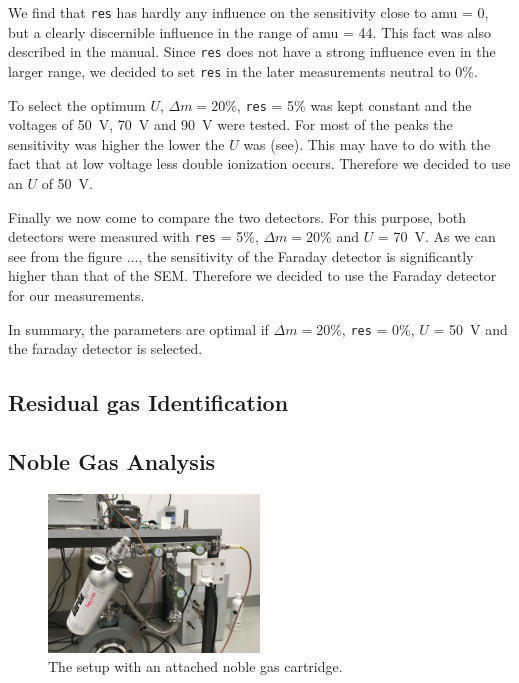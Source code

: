     We find that \texttt{res} has hardly any influence on the sensitivity close to amu = 0, but a clearly discernible influence in the range of amu = 44. This fact was also described in the manual. Since \texttt{res} does not have a strong influence even in the larger range, we decided to set \texttt{res} in the later measurements neutral to 0\%. 
    
    To select the optimum $U$, $\Delta m = 20 \%$, \texttt{res} = 5\% was kept constant and the voltages of 50~V, 70~V and 90~V were tested. For most of the peaks the sensitivity was higher the lower the $U$ was (see). This may have to do with the fact that at low voltage less double ionization occurs. Therefore we decided to use an $U$ of 50~V.  
    
    Finally we now come to compare the two detectors. For this purpose, both detectors were measured with \texttt{res} = 5\%, $\Delta m = 20\%$ and $U$ = 70~V. As we can see from the figure ..., the sensitivity of the Faraday detector is significantly higher than that of the SEM. Therefore we decided to use the Faraday detector for our measurements. 
    
    In summary, the parameters are optimal if $\Delta m = 20\%$, \texttt{res} = 0\%, $U$ = 50~V and the faraday detector is selected. 
    
    \subsection{Residual gas Identification}
    \subsection{Noble Gas Analysis}
    \begin{figure}[h!]
    \centering
    \includegraphics[width=0.5\textwidth]{Report/pictures/cartridge.JPG}
    \caption{The setup with an attached noble gas cartridge.}
    \label{fig:noblegas}
    \end{figure}
    
